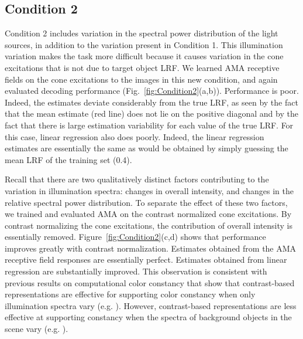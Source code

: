 \documentclass{jov}
\begin{document}
\subsection{Condition 2}

Condition 2 includes variation in the spectral power distribution of the light sources, in addition to the variation present in Condition 1. 
This illumination variation makes the task more difficult because it causes variation in the cone excitations that is not due to target object LRF. 
We learned AMA receptive fields on the cone excitations to the images in this new condition, and again evaluated decoding performance (Fig.~\ref{fig:Condition2}(a,b)). 
Performance is poor.
Indeed, the estimates deviate considerably from the true LRF, as seen by the fact that the mean estimate
(red line) does not lie on the positive diagonal and by the fact that there is large estimation variability for each
value of the true LRF.
For this case, linear regression also does poorly. Indeed, the linear regression estimates are essentially the same as would be obtained
by simply guessing the mean LRF of the training set (0.4).

Recall that there are two qualitatively distinct factors contributing to the variation in illumination spectra: changes in overall intensity, and changes in the relative spectral power distribution. 
To separate the effect of these two factors, we trained and evaluated AMA on the contrast normalized cone excitations. 
By contrast normalizing the cone excitations, the contribution of overall intensity is essentially removed.
Figure~\ref{fig:Condition2}(c,d) shows that performance improves greatly with contrast normalization. 
Estimates obtained from the AMA receptive field responses are essentially perfect. 
Estimates obtained from linear regression are substantially improved.
This observation is consistent with previous results on computational color constancy that show that 
contrast-based representations are effective for supporting color constancy when only illumination spectra vary (e.g. ).
However, contrast-based representations are less effective at supporting constancy when the spectra of background objects in the scene vary (e.g. ).
\end{document}
